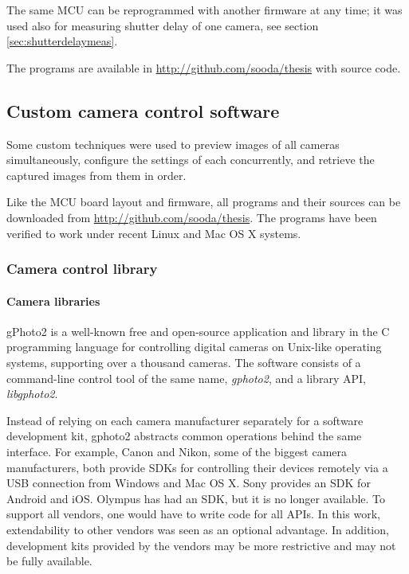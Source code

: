 The same MCU can be reprogrammed with another firmware at any time; it was used also for measuring shutter delay of one camera, see section \ref{sec:shutterdelaymeas}.

The programs are available in \url {http://github.com/sooda/thesis} with source code.


\subsection{Custom camera control software} %



Some custom techniques were used to preview images of all cameras simultaneously, configure the settings of each concurrently, and retrieve the captured images from them in order.

Like the MCU board layout and firmware, all programs and their sources can be downloaded from \url {http://github.com/sooda/thesis}.
The programs have been verified to work under recent Linux and Mac OS X systems.


\subsubsection{Camera control library} %

\paragraph{Camera libraries}
gPhoto2 \cite{gphoto2} is a well-known free and open-source application and library in the C programming language for controlling digital cameras on Unix-like operating systems, supporting over a thousand cameras.
The software consists of a command-line control tool of the same name, \emph{gphoto2}, and a library API, \emph{libgphoto2}.

Instead of relying on each camera manufacturer separately for a software development kit, gphoto2 abstracts common operations behind the same interface.
For example, Canon and Nikon, some of the biggest camera manufacturers, both provide SDKs for controlling their devices remotely via a USB connection from Windows and Mac OS X. \cite{canonedsdk} \cite{nikonsdk}
Sony provides an SDK for Android and iOS. \cite{sonysdk}
Olympus has had an SDK, but it is no longer available. \cite{olympussdk}
To support all vendors, one would have to write code for all APIs.
In this work, extendability to other vendors was seen as an optional advantage.
In addition, development kits provided by the vendors may be more restrictive and may not be fully available.

